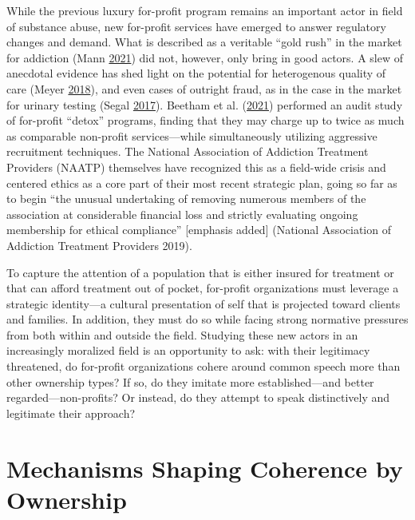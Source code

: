 \documentclass[
  12pt,
]{article}
\begin{document}
While the previous luxury for-profit program remains an important actor in field of substance abuse, new for-profit services have emerged to answer regulatory changes and demand. What is described as a veritable ``gold rush'' in the market for addiction (Mann \protect\hyperlink{ref-mann2021}{2021}) did not, however, only bring in good actors. A slew of anecdotal evidence has shed light on the potential for heterogenous quality of care (Meyer \protect\hyperlink{ref-meyer2018}{2018}), and even cases of outright fraud, as in the case in the market for urinary testing (Segal \protect\hyperlink{ref-segal2017}{2017}). Beetham et al. (\protect\hyperlink{ref-beetham2021}{2021}) performed an audit study of for-profit ``detox'' programs, finding that they may charge up to twice as much as comparable non-profit services---while simultaneously utilizing aggressive recruitment techniques. The National Association of Addiction Treatment Providers (NAATP) themselves have recognized this as a field-wide crisis and centered ethics as a core part of their most recent strategic plan, going so far as to begin ``the unusual undertaking of removing numerous members of the association at considerable financial loss and strictly evaluating ongoing membership for ethical compliance'' {[}emphasis added{]} (National Association of Addiction Treatment Providers 2019).

\vspace{12pt}

To capture the attention of a population that is either insured for treatment or that can afford treatment out of pocket, for-profit organizations must leverage a strategic identity---a cultural presentation of self that is projected toward clients and families. In addition, they must do so while facing strong normative pressures from both within and outside the field. Studying these new actors in an increasingly moralized field is an opportunity to ask: with their legitimacy threatened, do for-profit organizations cohere around common speech more than other ownership types? If so, do they imitate more established---and better regarded---non-profits? Or instead, do they attempt to speak distinctively and legitimate their approach?

\hypertarget{mechanisms-shaping-coherence-by-ownership}{%
\section{Mechanisms Shaping Coherence by Ownership}\label{mechanisms-shaping-coherence-by-ownership}}
\end{document}
